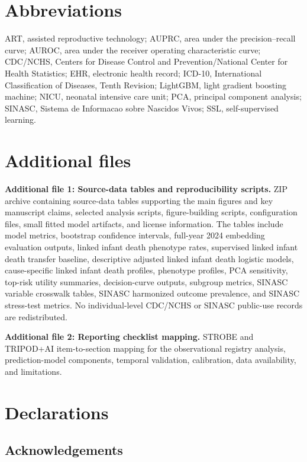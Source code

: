 \documentclass[pdflatex,sn-vancouver-num]{sn-jnl}
\begin{document}
\section*{Abbreviations}

ART, assisted reproductive technology; AUPRC, area under the precision--recall curve; AUROC, area under the receiver operating characteristic curve; CDC/NCHS, Centers for Disease Control and Prevention/National Center for Health Statistics; EHR, electronic health record; ICD-10, International Classification of Diseases, Tenth Revision; LightGBM, light gradient boosting machine; NICU, neonatal intensive care unit; PCA, principal component analysis; SINASC, Sistema de Informacao sobre Nascidos Vivos; SSL, self-supervised learning.

\section*{Additional files}

\textbf{Additional file 1: Source-data tables and reproducibility scripts.} ZIP archive containing source-data tables supporting the main figures and key manuscript claims, selected analysis scripts, figure-building scripts, configuration files, small fitted model artifacts, and license information. The tables include model metrics, bootstrap confidence intervals, full-year 2024 embedding evaluation outputs, linked infant death phenotype rates, supervised linked infant death transfer baseline, descriptive adjusted linked infant death logistic models, cause-specific linked infant death profiles, phenotype profiles, PCA sensitivity, top-risk utility summaries, decision-curve outputs, subgroup metrics, SINASC variable crosswalk tables, SINASC harmonized outcome prevalence, and SINASC stress-test metrics. No individual-level CDC/NCHS or SINASC public-use records are redistributed.

\textbf{Additional file 2: Reporting checklist mapping.} STROBE and TRIPOD+AI item-to-section mapping for the observational registry analysis, prediction-model components, temporal validation, calibration, data availability, and limitations.

\section*{Declarations}

\subsection*{Acknowledgements}
\end{document}
